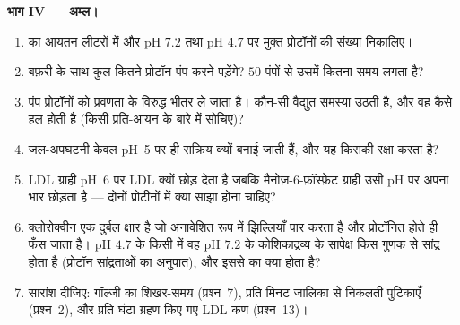 \begin{problem}
\medskip
\noindent\textbf{भाग IV --- अम्ल।}
\begin{enumerate}[resume]
  \item {} का आयतन लीटरों में और pH $7.2$ तथा pH $4.7$ पर मुक्त
        प्रोटॉनों की संख्या निकालिए।
  \item बफ़री के साथ कुल कितने प्रोटॉन पंप करने पड़ेंगे? $50$ पंपों से
        उसमें कितना समय लगता है?
  \item पंप प्रोटॉनों को प्रवणता के विरुद्ध भीतर ले जाता है। कौन-सी
        वैद्युत समस्या उठती है, और वह कैसे हल होती है (किसी प्रति-आयन
        के बारे में सोचिए)?
  \item जल-अपघटनी केवल pH~5 पर ही सक्रिय क्यों बनाई जाती हैं, और यह
        किसकी रक्षा करता है?
  \item LDL ग्राही pH~6 पर LDL क्यों छोड़ देता है जबकि
        मैनोज़-6-फ़ॉस्फ़ेट ग्राही उसी pH पर अपना भार छोड़ता है --- दोनों
        प्रोटीनों में क्या साझा होना चाहिए?
  \item क्लोरोक्वीन एक दुर्बल क्षार है जो अनावेशित रूप में झिल्लियाँ
        पार करता है और प्रोटॉनित होते ही फँस जाता है। pH $4.7$ के किसी
         में वह pH $7.2$ के कोशिकाद्रव्य के सापेक्ष किस गुणक से
        सांद्र होता है (प्रोटॉन सांद्रताओं का अनुपात), और इससे 
        का क्या होता है?
  \item सारांश दीजिए: गॉल्जी का शिखर-समय (प्रश्न~7), प्रति मिनट
        जालिका से निकलती पुटिकाएँ (प्रश्न~2), और प्रति घंटा ग्रहण किए
        गए LDL कण (प्रश्न~13)।
\end{enumerate}
\end{problem}
